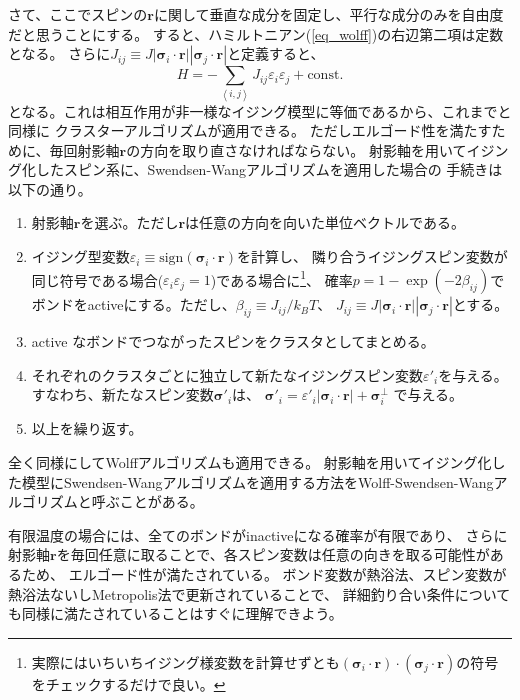 \documentclass{jarticle}
\begin{document}
さて、ここでスピンの$\mathbf{r}$に関して垂直な成分を固定し、平行な成分のみを自由度だと思うことにする。
すると、ハミルトニアン(\ref{eq_wolff})の右辺第二項は定数となる。
さらに$J_{ij} \equiv J  |\mathbf{\sigma}_i \cdot \mathbf{r}|  |\mathbf{\sigma}_j \cdot \mathbf{r}| $と定義すると、
\begin{equation}
  H = -\sum_{\left<i, j\right>} J_{ij}\varepsilon_i  \varepsilon_j  + \mathrm{const.}
\end{equation}
となる。これは相互作用が非一様なイジング模型に等価であるから、これまでと同様に
クラスターアルゴリズムが適用できる。
ただしエルゴード性を満たすために、毎回射影軸$\mathbf{r}$の方向を取り直さなければならない。
射影軸を用いてイジング化したスピン系に、Swendsen-Wangアルゴリズムを適用した場合の
手続きは以下の通り。
\begin{enumerate}
  \item 射影軸$\mathbf{r}$を選ぶ。ただし$\mathbf{r}$は任意の方向を向いた単位ベクトルである。
  \item イジング型変数$\varepsilon_i \equiv \mathrm{sign}(\mathbf{\sigma}_i \cdot \mathbf{r})$を計算し、
        隣り合うイジングスピン変数が同じ符号である場合($\varepsilon_i \varepsilon_j = 1$)である場合に\footnote{%
          実際にはいちいちイジング様変数を計算せずとも$(\mathbf{\sigma}_i \cdot \mathbf{r})\cdot (\mathbf{\sigma}_j \cdot \mathbf{r})$の符号をチェックするだけで良い。
        }、
        確率$p = 1 - \exp(-2 \beta_{ij})$でボンドをactiveにする。ただし、$\beta_{ij} \equiv J_{ij}/k_B T$、
        $J_{ij} \equiv J  |\mathbf{\sigma}_i \cdot \mathbf{r}|  |\mathbf{\sigma}_j \cdot \mathbf{r}| $とする。
  \item  active なボンドでつながったスピンをクラスタとしてまとめる。
  \item それぞれのクラスタごとに独立して新たなイジングスピン変数$\varepsilon'_i$を与える。
        すなわち、新たなスピン変数$\mathbf{\sigma}'_i$は、
        $\mathbf{\sigma}'_i =  \varepsilon'_i |\mathbf{\sigma}_i \cdot \mathbf{r}| + \mathbf{\sigma}_i^\perp$
        で与える。
  \item 以上を繰り返す。
\end{enumerate}
全く同様にしてWolffアルゴリズムも適用できる。
射影軸を用いてイジング化した模型にSwendsen-Wangアルゴリズムを適用する方法をWolff-Swendsen-Wangアルゴリズムと呼ぶことがある。

有限温度の場合には、全てのボンドがinactiveになる確率が有限であり、
さらに射影軸$\mathbf{r}$を毎回任意に取ることで、各スピン変数は任意の向きを取る可能性があるため、
エルゴード性が満たされている。
ボンド変数が熱浴法、スピン変数が熱浴法ないしMetropolis法で更新されていることで、
詳細釣り合い条件についても同様に満たされていることはすぐに理解できよう。
\end{document}
